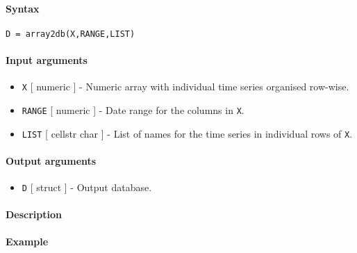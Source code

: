 


	\paragraph{Syntax}

\begin{verbatim}
D = array2db(X,RANGE,LIST)
\end{verbatim}

\paragraph{Input arguments}

\begin{itemize}
\item
  \texttt{X} {[} numeric {]} - Numeric array with individual time series
  organised row-wise.
\item
  \texttt{RANGE} {[} numeric {]} - Date range for the columns in
  \texttt{X}.
\item
  \texttt{LIST} {[} cellstr \textbar{} char {]} - List of names for the
  time series in individual rows of \texttt{X}.
\end{itemize}

\paragraph{Output arguments}

\begin{itemize}
\itemsep1pt\parskip0pt
\item
  \texttt{D} {[} struct {]} - Output database.
\end{itemize}

\paragraph{Description}

\paragraph{Example}


